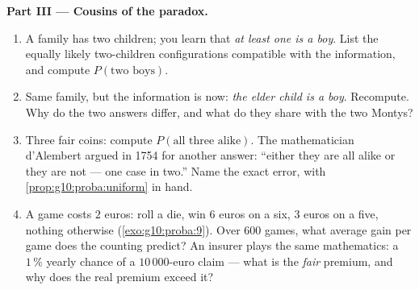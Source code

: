\begin{problem}
\medskip
\noindent\textbf{Part III --- Cousins of the paradox.}
\begin{enumerate}[resume]
  \item A family has two children; you learn that \emph{at least
        one is a boy}. List the equally likely two-children
        configurations compatible with the information, and
        compute $P(\text{two boys})$.
  \item Same family, but the information is now: \emph{the elder
        child is a boy}. Recompute. Why do the two answers
        differ, and what do they share with the two Montys?
  \item Three fair coins: compute $P(\text{all three alike})$.
        The mathematician d'Alembert argued in 1754 for another
        answer: ``either they are all alike or they are not ---
        one case in two.'' Name the exact error, with
        \cref{prop:g10:proba:uniform} in hand.
  \item A game costs $2$ euros: roll a die, win $6$ euros on a
        six, $3$ euros on a five, nothing otherwise
        (\cref{exo:g10:proba:9}). Over $600$ games, what
        average gain per game does the counting predict? An
        insurer plays the same mathematics: a $1\,\%$ yearly
        chance of a $10\,000$-euro claim --- what is the
        \emph{fair} premium, and why does the real premium
        exceed it?
\end{enumerate}


\end{problem}
